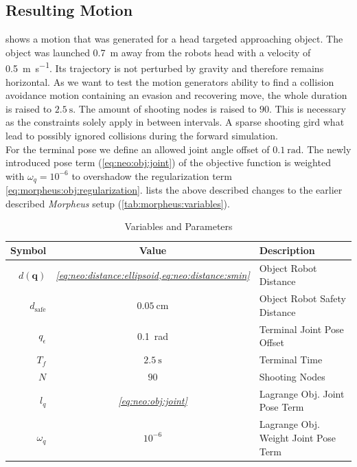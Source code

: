\subsection{Resulting Motion} \label{sec:neo:result}
 shows a motion that was generated for a head targeted approaching object.
The object was launched \SI{0.7}{\m} away from the robots head with a velocity of \SI{0.5}{\m \per \s}.
Its trajectory is not perturbed by gravity and therefore remains horizontal.
As we want to test the motion generators ability to find a collision avoidance motion containing an evasion and recovering move, the whole duration is raised to $\SI{2.5}{\s}$.
The amount of shooting nodes is raised to $90$.
This is necessary as the constraints solely apply in between intervals.
A sparse shooting gird what lead to possibly ignored collisions during the forward simulation.
\\
For the terminal pose we define an allowed joint angle offset of $\SI{0.1}{\radian}$.
The newly introduced pose term (\cref{eq:neo:obj:joint}) of the objective function is weighted with $\omega_q = 10^{-6}$ to overshadow the regularization term \cref{eq:morpheus:obj:regularization}.
 lists the above described changes to the earlier described \textit{Morpheus} setup (\cref{tab:morpheus:variables}).
\begin{table}[H]
  \centering
  \begin{tabularx}{0.7\textwidth}{rcl}
  \toprule
    Symbol & Value & \multicolumn{1}{X}{Description} \\
  \midrule
    $d(\bm q)$ & \textit{\cref{eq:neo:distance:ellipsoid,eq:neo:distance:smin}} & Object Robot Distance \\
    $d_\text{safe}$ & $\SI{0.05}{\centi\metre}$ & Object Robot Safety Distance \\
  \midrule
    $q_\epsilon$ & \SI{0.1}{\radian} & Terminal Joint Pose Offset \\
  \midrule
    $T_f$ & $\SI{2.5}{\second}$ & Terminal Time \\
    $N$ & $90$ & Shooting Nodes \\
    $l_q$ & \textit{\cref{eq:neo:obj:joint}} & Lagrange Obj. Joint Pose Term \\
    $\omega_q$ & $10^{-6}$ & Lagrange Obj. Weight Joint Pose Term \\
  \bottomrule
  \end{tabularx}
  \caption{Variables and Parameters}
  \label{tab:neo:variables}
\end{table}
